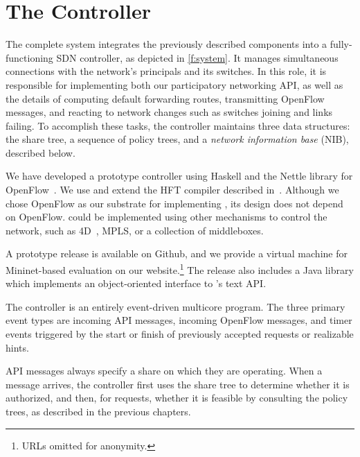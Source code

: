 \chapter{The \sys Controller}
\label{sec:FullSystem}



The complete \sys system integrates the previously described
components into a fully-functioning SDN controller, as depicted in
\autoref{f:system}.  It manages simultaneous connections with the
network's principals and its switches. In this role, it is
responsible for implementing both our participatory networking API,
as well as the details of computing default forwarding routes,
transmitting OpenFlow messages, and reacting to network changes such
as switches joining and links failing.  To accomplish these tasks,
the \sys controller maintains three data structures: the share tree,
a sequence of policy trees, and a \emph{network information base}
(NIB), described below.

We have developed a prototype \sys controller using Haskell and the
Nettle library for OpenFlow~\cite{Voellmy:2011}. We use and extend
the HFT compiler described in~\cite{Ferguson:2012b}.  Although
we chose OpenFlow as our substrate for implementing \sys, its design
does not depend on OpenFlow. \sys could be implemented using other
mechanisms to control the network, such as 4D~\cite{Greenberg:2005},
MPLS, or a collection of middleboxes.

A prototype release is available on Github, and we provide a virtual
machine for Mininet-based evaluation on our website.\footnote{URLs
omitted for anonymity.} The release also includes a Java library
which implements an object-oriented interface to \sys's text API.

The \sys controller is an entirely event-driven multicore program.
The three primary event types are incoming \sys API messages,
incoming OpenFlow messages, and timer events triggered by the start
or finish of previously accepted requests or realizable hints.

API messages always specify a share on which they
are operating. When a message arrives, the \sys controller first
uses the share tree to determine whether it is authorized, and then,
for requests, whether it is feasible by consulting the policy
trees, as described in the previous chapters.

